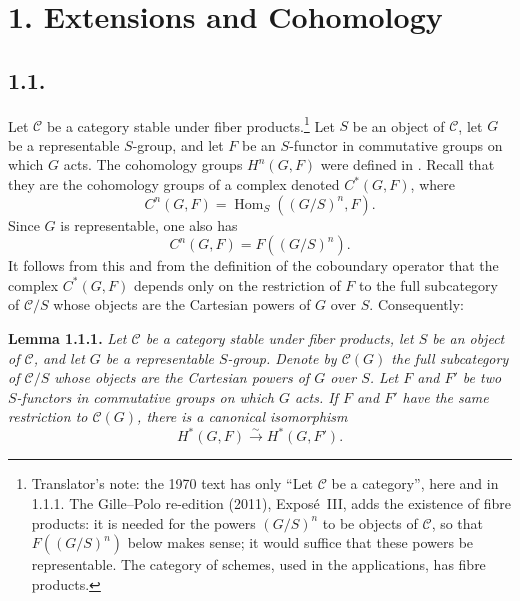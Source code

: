 

\section*{1. Extensions and Cohomology}

\subsection*{1.1.}
Let \(\mathscr C\) be a category stable under fiber
products.\footnote{Translator's note: the 1970 text has only ``Let
\(\mathscr C\) be a category'', here and in 1.1.1. The Gille--Polo re-edition
(2011), Exposé~III, adds the existence of fibre products: it is needed for the
powers \((G/S)^n\) to be objects of \(\mathscr C\), so that
\(F((G/S)^n)\) below makes sense; it would suffice that these powers be
representable. The category of schemes, used in the applications, has fibre
products.}
Let \(S\) be an object of \(\mathscr C\), let \(G\) be a representable
\(S\)-group, and let \(F\) be an \(S\)-functor in commutative groups
on which \(G\) acts. The cohomology groups \(H^n(G,F)\) were defined
in . Recall that they are the cohomology groups of a complex
denoted \(C^\ast(G,F)\), where
\[
 C^n(G,F)=\operatorname{Hom}_S((G/S)^n,F).
\]
Since \(G\) is representable, one also has
\[
 C^n(G,F)=F((G/S)^n).
\]
It follows from this and from the definition of the coboundary operator
that the complex \(C^\ast(G,F)\) depends only on the restriction of
\(F\) to the full subcategory of \(\mathscr C/S\) whose objects are
the Cartesian powers of \(G\) over \(S\). Consequently:

\medskip
\noindent{}\textbf{Lemma 1.1.1.}
\textit{Let \(\mathscr C\) be a category stable under fiber products,
let \(S\) be an object of \(\mathscr C\), and let \(G\) be a
representable \(S\)-group. Denote by \(\mathscr C(G)\) the full
subcategory of \(\mathscr C/S\) whose objects are the Cartesian powers
of \(G\) over \(S\). Let \(F\) and \(F'\) be two \(S\)-functors in
commutative groups on which \(G\) acts. If \(F\) and \(F'\) have the
same restriction to \(\mathscr C(G)\), there is a canonical
isomorphism}
\[
 H^\ast(G,F)\xrightarrow{\sim}H^\ast(G,F').
\]

